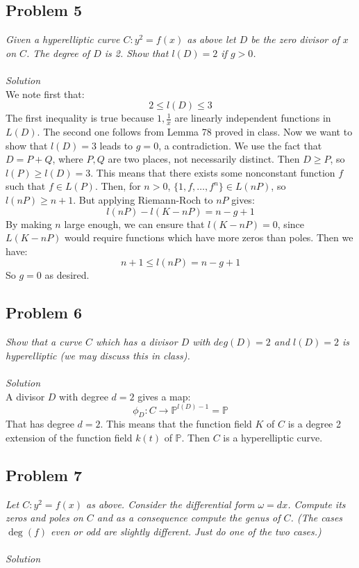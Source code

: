 \documentclass[12 pt]{article}
\newcommand{\Proj}{\mathbb{P}}
\begin{document}
\subsection*{Problem 5}
\emph{Given a hyperelliptic curve $C : y^2 = f(x)$ as above let $D$ be the zero divisor of $x$ on $C$. The degree of $D$ is 2. Show that $l(D) = 2$ if $g > 0$.}
\\
\\
\emph{Solution}
\\
We note first that:
\[        2 \leq l(D) \leq 3      \]
The first inequality is true because $1, \frac{1}{x}$ are linearly independent functions in $L(D)$. The second one follows from Lemma 78 proved in class. Now we want to show that $l(D) = 3$ leads to $g=0$, a contradiction. We use the fact that $D = P + Q$, where $P,Q$ are two places, not necessarily distinct. Then $D \geq P$, so $l(P) \geq l(D) = 3$. This means that there exists some nonconstant function $f$ such that $f \in L(P)$. Then, for $n > 0$, $\{1, f, \dots ,f^n\} \in L(nP)$, so $l(nP) \geq n+1$. But applying Riemann-Roch to $nP$ gives:
\[          l(nP) - l(K - nP) = n - g + 1      \]
By making $n$ large enough, we can ensure that $l(K - nP) = 0$, since $L(K - nP)$ would require functions which have more zeros than poles. Then we have:
\[      n + 1 \leq l(nP) = n - g + 1        \]
So $g = 0$ as desired.

\subsection*{Problem 6}
\emph{Show that a curve $C$ which has a divisor $D$ with $deg(D) = 2$ and $l(D) = 2$ is hyperelliptic (we may discuss this in class).}
\\
\\
\emph{Solution}
\\
A divisor $D$ with degree $d=2$ gives a map:
\[        \phi_D : C \to \Proj^{l(D)-1}  = \Proj    \]
That has degree $d = 2$. This means that the function field $K$ of $C$ is a degree 2 extension of the function field $k(t)$ of $\Proj$. Then $C$ is a hyperelliptic curve.


\subsection*{Problem 7}
\emph{Let $C : y^2 = f(x)$ as above. Consider the differential form $\omega = dx$. Compute its zeros and poles on $C$ and as a consequence compute the genus of $C$. (The cases $\deg(f)$ even or odd are slightly different. Just do one of the two cases.)}
\\
\\
\emph{Solution}
\\
\end{document}
